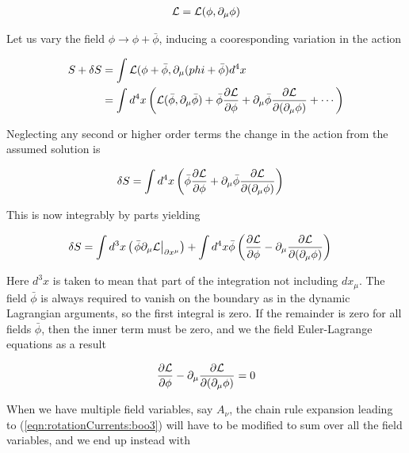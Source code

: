 \begin{align}\label{eqn:rotationCurrents:boo2}
\mathcal{L} = \mathcal{L}(\phi, \partial_\mu \phi)
\end{align}

Let us vary the field $\phi \rightarrow \phi + \bar{\phi}$, inducing a cooresponding variation in the action

\begin{align*}
S + \delta S
&= \int \mathcal{L}(\phi + \bar{\phi}, \partial_\mu (phi + \bar{\phi}) d^4 x \\
&= \int d^4 x \left(
\mathcal{L}(\bar{\phi}, \partial_\mu \bar{\phi})
+
\bar{\phi} \frac{\partial {\mathcal{L}}}{\partial {\phi}}
+\partial_\mu \bar{\phi} \frac{\partial {\mathcal{L}}}{\partial {(\partial_\mu \phi)}}
+ \cdots \right)
\end{align*}

Neglecting any second or higher order terms the change in the action from the assumed solution is

\begin{align}\label{eqn:rotationCurrents:boo3}
\delta S
&=
\int d^4 x \left( \bar{\phi} \frac{\partial {\mathcal{L}}}{\partial {\phi}} +\partial_\mu \bar{\phi} \frac{\partial {\mathcal{L}}}{\partial {(\partial_\mu \phi)}} \right)
\end{align}

This is now integrably by parts yielding

\begin{align}\label{eqn:rotationCurrents:boo4}
\delta S
&=
\int d^3 x \left( {\left. \bar{\phi} \partial_\mu \mathcal{L} \right\vert}_{\partial x^\mu} \right)
+
\int d^4 x \bar{\phi} \left( \frac{\partial {\mathcal{L}}}{\partial {\phi}} - \partial_\mu \frac{\partial {\mathcal{L}}}{\partial {(\partial_\mu \phi)}} \right)
\end{align}

Here $d^3 x$ is taken to mean that part of the integration not including $dx_\mu$.  The field $\bar{\phi}$ is always required to vanish on the boundary as in the dynamic Lagrangian arguments, so the first integral is zero.  If the remainder is zero for all fields $\bar{\phi}$, then the inner term must be zero, and we the field Euler-Lagrange equations as a result

\begin{align}\label{eqn:rotationCurrents:boo5}
\frac{\partial {\mathcal{L}}}{\partial {\phi}} - \partial_\mu \frac{\partial {\mathcal{L}}}{\partial {(\partial_\mu \phi)}} = 0
\end{align}

When we have multiple field variables, say $A_\nu$, the chain rule expansion leading to (\ref{eqn:rotationCurrents:boo3}) will have to be modified to sum over all the field variables, and we end up instead with


